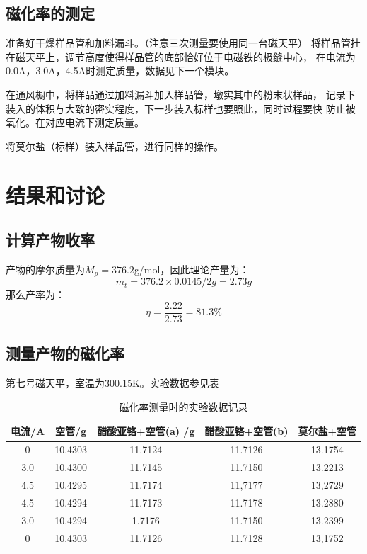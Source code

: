 \documentclass[a4paper,zihao=5,UTF8]{ctexart}
\begin{document}
        \subsection{磁化率的测定}
        准备好干燥样品管和加料漏斗。（注意三次测量要使用同一台磁天平）
        将样品管挂在磁天平上，调节高度使得样品管的底部恰好位于电磁铁的极缝中心，
        在电流为0.0A，3.0A，4.5A时测定质量，数据见下一个模块。
        \par 
        在通风橱中，将样品通过加料漏斗加入样品管，墩实其中的粉末状样品，
        记录下装入的体积与大致的密实程度，下一步装入标样也要照此，同时过程要快
        防止被氧化。在对应电流下测定质量。
        \par 
        将莫尔盐（标样）装入样品管，进行同样的操作。
    \section{结果和讨论}
        \subsection{计算产物收率}
        产物的摩尔质量为$M_p = 376.2$g/mol，因此理论产量为：
        \begin{equation}
            m_{t} = 376.2 \times 0.0145 / 2 g = 2.73g
        \end{equation} 
        那么产率为：
        \begin{equation}
            \eta = \frac{2.22}{2.73} = 81.3\%
        \end{equation}
        \subsection{测量产物的磁化率}
        第七号磁天平，室温为300.15K。实验数据参见表 
        \begin{table}[htbp]
            \centering 
            \caption{磁化率测量时的实验数据记录}
            \begin{tabular}[htbp]{ccccc}
                \toprule
                电流/A & 空管/g & 醋酸亚铬+空管(a) /g & 醋酸亚铬+空管(b) & 莫尔盐+空管\\
                \midrule
                0  & 10.4303 & 11.7124 & 11.7126 & 13.1754\\
                3.0 & 10.4300 & 11.7145 & 11.7150 & 13.2213\\
                4.5 & 10.4295 & 11.7174 & 11,7177 & 13,2729\\
                4.5 & 10.4294 & 11.7173 & 11.7178 & 13.2880\\
                3.0 & 10.4294 & 1.7176 & 11.7150 &  13.2399\\
                0 & 10.4303 & 11.7126 & 11.7128 & 13,1752\\
                \bottomrule
            \end{tabular}
        \end{table}
\end{document}
